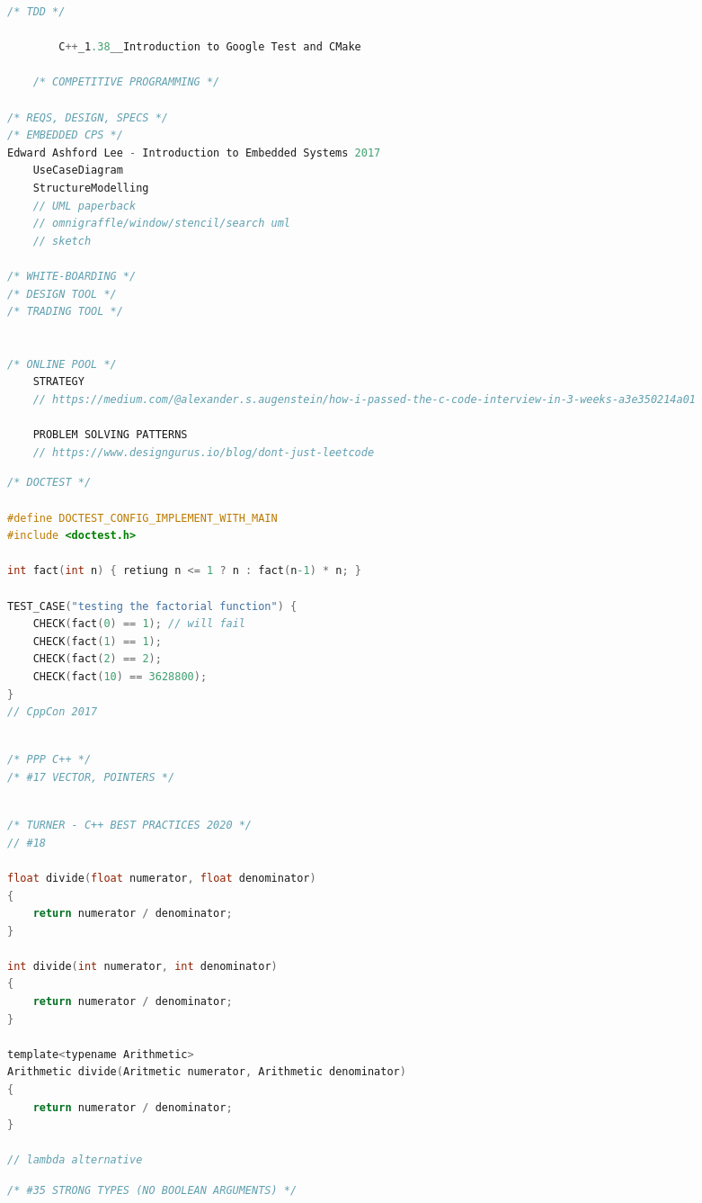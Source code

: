 \documentclass[8pt]{extarticle}
\begin{document}
\begin{small}
\begin{multicols}{2}
\begin{lstlisting}[language=C]
	/* TDD */
	
		C++_1.38__Introduction to Google Test and CMake
	
	/* COMPETITIVE PROGRAMMING */

/* REQS, DESIGN, SPECS */
/* EMBEDDED CPS */
Edward Ashford Lee - Introduction to Embedded Systems 2017
	UseCaseDiagram 
	StructureModelling
	// UML paperback
	// omnigraffle/window/stencil/search uml
	// sketch

/* WHITE-BOARDING */
/* DESIGN TOOL */
/* TRADING TOOL */


/* ONLINE POOL */
	STRATEGY
	// https://medium.com/@alexander.s.augenstein/how-i-passed-the-c-code-interview-in-3-weeks-a3e350214a01
	
	PROBLEM SOLVING PATTERNS
	// https://www.designgurus.io/blog/dont-just-leetcode

\end{lstlisting}

\begin{lstlisting}[language=C]
/* DOCTEST */

#define DOCTEST_CONFIG_IMPLEMENT_WITH_MAIN
#include <doctest.h>

int fact(int n) { retiung n <= 1 ? n : fact(n-1) * n; }

TEST_CASE("testing the factorial function") {
	CHECK(fact(0) == 1); // will fail
	CHECK(fact(1) == 1);
	CHECK(fact(2) == 2);
	CHECK(fact(10) == 3628800);
}
// CppCon 2017
\end{lstlisting}

\begin{lstlisting}[language=C]

/* PPP C++ */
/* #17 VECTOR, POINTERS */
	
\end{lstlisting}


\begin{lstlisting}[language=C]
/* TURNER - C++ BEST PRACTICES 2020 */
// #18

float divide(float numerator, float denominator)
{
	return numerator / denominator;
}

int divide(int numerator, int denominator)
{
	return numerator / denominator;
}

template<typename Arithmetic>
Arithmetic divide(Aritmetic numerator, Arithmetic denominator)
{
	return numerator / denominator;
}

// lambda alternative
\end{lstlisting}

\begin{lstlisting}[language=C]
/* #35 STRONG TYPES (NO BOOLEAN ARGUMENTS) */


\end{lstlisting}
\end{multicols}
\end{small}
\end{document}
